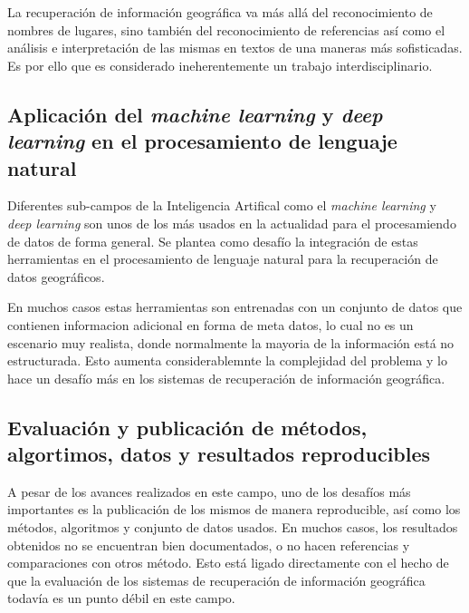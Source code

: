 La recuperación de información geográfica va más allá del
reconocimiento de nombres de lugares, sino también del reconocimiento de referencias así
como el análisis e interpretación de las mismas en textos de una maneras más
sofisticadas. Es por ello que es considerado ineherentemente un trabajo
interdisciplinario.

\subsection{Aplicación del \emph{machine learning} y \emph{deep learning} en el
procesamiento de lenguaje natural}\label{sec:ml}

Diferentes sub-campos de la Inteligencia Artifical como el \emph{machine
learning} y \emph{deep learning} son unos de los más usados en la actualidad
para el procesamiendo de datos de forma general. Se plantea como desafío la
integración de estas herramientas en el procesamiento de lenguaje natural para
la recuperación de datos geográficos.

En muchos casos estas herramientas son entrenadas con un conjunto de datos que
contienen informacion adicional en forma de meta datos, lo cual no es un escenario
muy realista, donde normalmente la mayoria de la información está no estructurada.
Esto aumenta considerablemnte la complejidad del problema y lo hace un desafío más
en los sistemas de recuperación de información geográfica.

\subsection{Evaluación y publicación de métodos, algortimos, datos y
resultados reproducibles}\label{sec:publ}

A pesar de los avances realizados en este campo, uno de los desafíos más
importantes es la publicación de los mismos de manera reproducible, así como
los métodos, algoritmos y conjunto de datos usados. En muchos casos, los
resultados obtenidos no se encuentran bien documentados, o no hacen referencias
y comparaciones con otros método. Esto está ligado directamente con el hecho de
que la evaluación de los sistemas de recuperación de información geográfica todavía
es un punto débil en este campo.


\newpage

